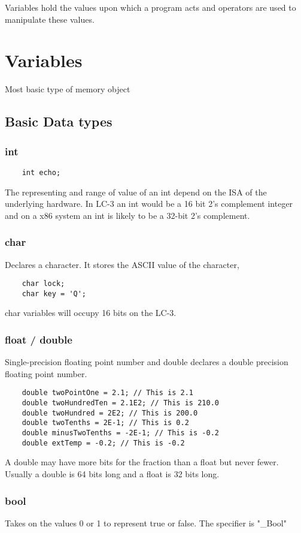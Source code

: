 Variables hold the values upon which a program acts and operators are used to manipulate these values.

\section{Variables}
Most basic type of memory object
\subsection{Basic Data types}
\subsubsection{int}
\begin{verbatim}
    int echo;
\end{verbatim}

The representing and range of value of an int depend on the ISA of the underlying hardware. In LC-3 an int would be a 16 bit 2's complement integer and on a x86 system an int is likely to be a 32-bit 2's complement.

\subsubsection{char}
Declares a character. It stores the ASCII value of the character, 
\begin{verbatim}
    char lock;
    char key = 'Q';
\end{verbatim}
char variables will occupy 16 bits on the LC-3.

\subsubsection{float / double}
Single-precision floating point number and double declares a double precision floating point number. 

\begin{verbatim}
    double twoPointOne = 2.1; // This is 2.1
    double twoHundredTen = 2.1E2; // This is 210.0
    double twoHundred = 2E2; // This is 200.0
    double twoTenths = 2E-1; // This is 0.2
    double minusTwoTenths = -2E-1; // This is -0.2
    double extTemp = -0.2; // This is -0.2
\end{verbatim}

A double may have more bits for the fraction than a float but never fewer. Usually a double is 64 bits long and a float is 32 bits long.


\subsubsection{bool}
Takes on the values 0 or 1 to represent true or false. The specifier is "\_Bool"

